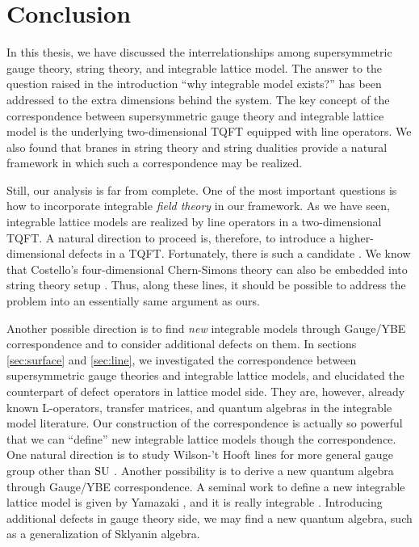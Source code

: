 \begin{comment}
\documentclass[11pt]{article}  %
\usepackage{Common/toshi}

\end{comment}



\section{Conclusion}
\label{sec:discussion}

In this thesis, we have discussed the interrelationships
among supersymmetric gauge theory, string theory, and integrable
lattice model. The answer to the question raised in
the introduction ``why integrable model exists?'' has been addressed to
the extra dimensions behind the system.
The key concept of the correspondence between supersymmetric gauge theory
and integrable lattice model is the underlying two-dimensional TQFT equipped
with line operators.
We also found that branes in string theory and string dualities
provide a natural framework in which such a
correspondence may be realized.


Still, our analysis is far from complete.
One of the most important questions is how to incorporate integrable
\emph{field theory} in our framework.
As we have seen, integrable lattice models %
are realized by line operators in a two-dimensional TQFT.
A natural direction to proceed is, therefore, to
introduce a higher-dimensional defects in a TQFT.
Fortunately, there is such a candidate \cite{Costello:2019tri}.
We know that Costello's four-dimensional Chern-Simons theory can also
be embedded into string theory setup \cite{Costello:2018txb}.
Thus, along these lines, it should be possible to address the problem
into an essentially same argument as ours.


Another possible direction is to find \emph{new} integrable
models through Gauge/YBE correspondence and to consider additional defects on them.
In sections \ref{sec:surface} and \ref{sec:line}, we investigated
the correspondence between supersymmetric gauge theories and integrable
lattice models, and elucidated the counterpart of defect operators in
lattice model side.
They are, however, already known L-operators, transfer matrices, and
quantum algebras in the integrable model literature.
Our construction of the correspondence is actually so powerful that
we can ``define'' new integrable lattice models though the correspondence.
One natural direction is to study Wilson-'t Hooft lines for more general gauge group
other than $\mathrm{SU}$ \cite{Hayashi:2020ofu}.
Another possibility is to derive a new quantum algebra through Gauge/YBE correspondence.
A seminal work to define a new integrable lattice model is given by Yamazaki \cite{Yamazaki:2013nra}, and
it is really integrable \cite{Kels:2015bda,Kels:2017toi,Kels:2017vbc}.
Introducing additional defects in gauge theory side, we may find a
new quantum algebra, such as a generalization of Sklyanin algebra.


